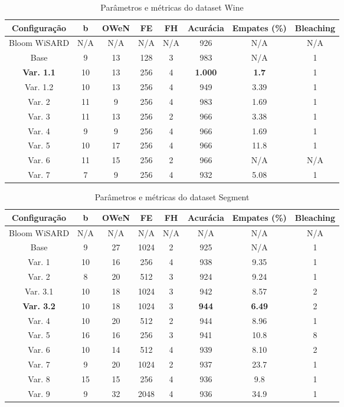 \documentclass{article}
\begin{document}
{\begin{table}[H]
\caption{Parâmetros e métricas do dataset Wine}
\begin{tabular}{|c|c|c|c|c|c|c|c|}
\hline
\textbf{Configuração} & \textbf{b} & \textbf{OWeN} & \textbf{FE} & \textbf{FH} & \textbf{Acurácia} & \textbf{Empates (\%)} & \textbf{Bleaching} \\
\hline
Bloom WiSARD & N/A & N/A & N/A & N/A & 926 & N/A & N/A \\
\hline
Base & 9 & 13 & 128 & 3 & 983 & N/A & 1 \\
\hline
\textbf{Var. 1.1} & 10 & 13 & 256 & 4 & \textbf{1.000} & \textbf{1.7} & 1 \\
\hline
Var. 1.2 & 10 & 13 & 256 & 4 & 949 & 3.39 & 1 \\
\hline
Var. 2 & 11 & 9 & 256 & 4 & 983 & 1.69 & 1 \\
\hline
Var. 3 & 11 & 13 & 256 & 2 & 966 & 3.38 & 1 \\
\hline
Var. 4 & 9 & 9 & 256 & 4 & 966 & 1.69 & 1 \\
\hline
Var. 5 & 10 & 17 & 256 & 4 & 966 & 11.8 & 1 \\
\hline
Var. 6 & 11 & 15 & 256 & 2 & 966 & N/A & N/A \\
\hline
Var. 7 & 7 & 9 & 256 & 4 & 932 & 5.08 & 1 \\
\hline
\end{tabular}
\end{table}

\begin{table}[H]
\caption{Parâmetros e métricas do dataset Segment}
\begin{tabular}{|c|c|c|c|c|c|c|c|}
\hline
\textbf{Configuração} & \textbf{b} & \textbf{OWeN} & \textbf{FE} & \textbf{FH} & \textbf{Acurácia} & \textbf{Empates (\%)} & \textbf{Bleaching} \\
\hline
Bloom WiSARD & N/A & N/A & N/A & N/A & N/A & N/A & N/A \\
\hline
Base & 9 & 27 & 1024 & 2 & 925 & N/A & 1 \\
\hline
Var. 1 & 10 & 16 & 256 & 4 & 938 & 9.35 & 1 \\
\hline
Var. 2 & 8 & 20 & 512 & 3 & 924 & 9.24 & 1 \\
\hline
Var. 3.1 & 10 & 18 & 1024 & 3 & 942 & 8.57 & 2 \\
\hline
\textbf{Var. 3.2} & 10 & 18 & 1024 & 3 & \textbf{944} & \textbf{6.49} & 2 \\
\hline
Var. 4 & 10 & 20 & 512 & 2 & 944 & 8.96 & 1 \\
\hline
Var. 5 & 16 & 16 & 256 & 3 & 941 & 10.8 & 8 \\
\hline
Var. 6 & 10 & 14 & 512 & 4 & 939 & 8.10 & 2 \\
\hline
Var. 7 & 9 & 20 & 1024 & 2 & 937 & 23.7 & 1 \\
\hline
Var. 8 & 15 & 15 & 256 & 4 & 936 & 9.8 & 1 \\
\hline
Var. 9 & 9 & 32 & 2048 & 4 & 936 & 34.9 & 1 \\
\hline
\end{tabular}
\end{table}

}
\end{document}
